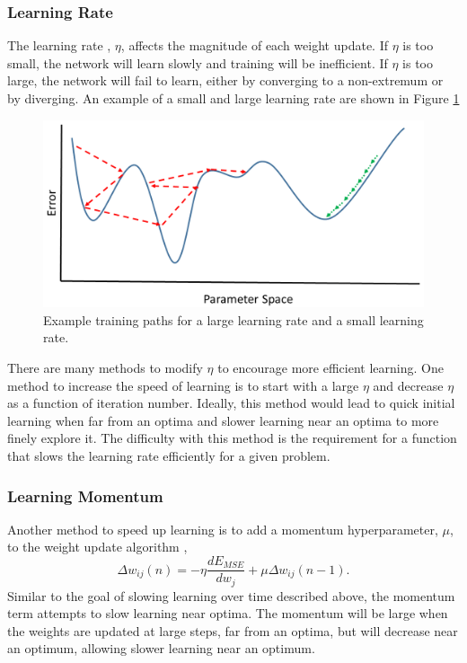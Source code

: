 \subsubsection{Learning Rate} \label{LearningRateSubsection}

The learning rate , $\eta$, affects the magnitude of each weight update. If $\eta$ is too small, the network will learn slowly and training will be inefficient. If $\eta$ is too large, the network will fail to learn, either by converging to a non-extremum or by diverging. An example of a small and large learning rate are shown in Figure \ref{fig:Learning_rate_comparison} 

\begin{figure}[H]
	\centering
	\includegraphics[width=0.8\linewidth]{images/Learning_rate_comparison_v2}
	\caption{Example training paths for a large learning rate and a small learning rate.}
	\label{fig:Learning_rate_comparison}
\end{figure}


There are many methods to modify $\eta$ to encourage more efficient learning. One method to increase the speed of learning is to start with a large $\eta$ and decrease $\eta$ as a function of iteration number. Ideally, this method would lead to quick initial learning when far from an optima and slower learning near an optima to more finely explore it. The difficulty with this method is the requirement for a function that slows the learning rate efficiently for a given problem.

\subsubsection{Learning Momentum}

Another method to speed up learning is to add a momentum hyperparameter, $\mu$, to the weight update algorithm \cite{Yu1997}, 
%
\begin{equation} \label{eq:update_momentum}
\Delta w_{ij}(n) = - \eta \frac{dE_{MSE}}{dw_j} +\mu \Delta w_{ij}(n-1).
\end{equation}
%
Similar to the goal of slowing learning over time described above, the momentum term attempts to slow learning near optima. The momentum will be large when the weights are updated at large steps, far from an optima, but will decrease near an optimum, allowing slower learning near an optimum. 
 
